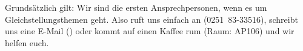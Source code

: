 \begin{multicols}{2}
Grundsätzlich gilt: Wir sind die ersten Ansprechpersonen, wenn es um Gleichstellungsthemen geht. Also ruft uns einfach an \mbox{(0251 83-33516)}, schreibt uns eine E-Mail (\textbf{}) oder kommt auf einen Kaffee rum (Raum: AP106) und wir helfen euch.


\end{multicols}

